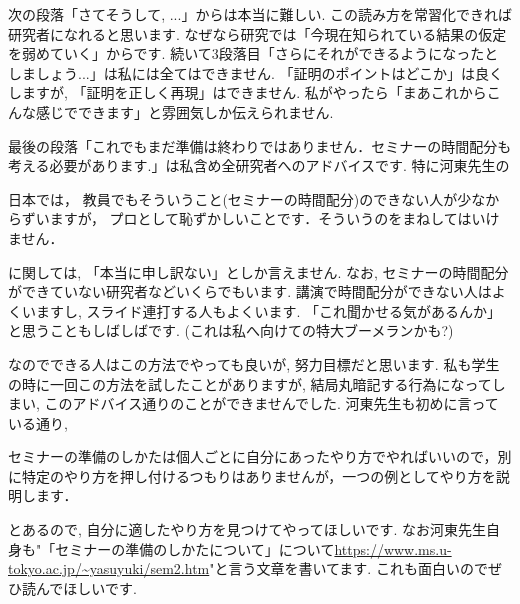 次の段落「さてそうして, ...」からは本当に難しい. この読み方を常習化できれば研究者になれると思います. 
なぜなら研究では「今現在知られている結果の仮定を弱めていく」からです. 
続いて3段落目「さらにそれができるようになったとしましょう...」は私には全てはできません. 「証明のポイントはどこか」は良くしますが, 「証明を正しく再現」はできません. 私がやったら「まあこれからこんな感じでできます」と雰囲気しか伝えられません.  

最後の段落「これでもまだ準備は終わりではありません．セミナーの時間配分も考える必要があります.」は私含め全研究者へのアドバイスです. 
特に河東先生の
\begin{tcolorbox}[mybox]
日本では， 教員でもそういうこと(セミナーの時間配分)のできない人が少なからずいますが， プロとして恥ずかしいことです．そういうのをまねしてはいけません．
\end{tcolorbox}
に関しては, 「本当に申し訳ない」としか言えません. 
なお, セミナーの時間配分ができていない研究者などいくらでもいます. 
講演で時間配分ができない人はよくいますし, スライド連打する人もよくいます. 
「これ聞かせる気があるんか」と思うこともしばしばです. (これは私へ向けての特大ブーメランかも?)

なのでできる人はこの方法でやっても良いが, 努力目標だと思います.
私も学生の時に一回この方法を試したことがありますが, 結局丸暗記する行為になってしまい, このアドバイス通りのことができませんでした. 
河東先生も初めに言っている通り, 
\begin{tcolorbox}[mybox]
セミナーの準備のしかたは個人ごとに自分にあったやり方でやればいいので，別に特定のやり方を押し付けるつもりはありませんが，一つの例としてやり方を説明します．
\end{tcolorbox}
とあるので, 自分に適したやり方を見つけてやってほしいです. なお河東先生自身も"「セミナーの準備のしかたについて」について\url{https://www.ms.u-tokyo.ac.jp/~yasuyuki/sem2.htm}"と言う文章を書いてます. これも面白いのでぜひ読んでほしいです. 

